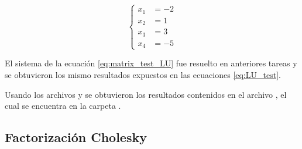 \begin{equation}
    \begin{cases}
        x_1 & = -2 \\
        x_2 & = 1  \\
        x_3 & = 3  \\
        x_4 & = -5
    \end{cases}
    \label{eq:LU_test}
\end{equation}

El sistema de la ecuación \ref{eq:matrix_test_LU} fue resuelto en anteriores tareas y se obtuvieron los mismo resultados expuestos en las ecuaciones \ref{eq:LU_test}.

Usando los archivos  y  se obtuvieron los resultados contenidos en el archivo , el cual se encuentra en la carpeta .
\subsection{Factorización Cholesky}

